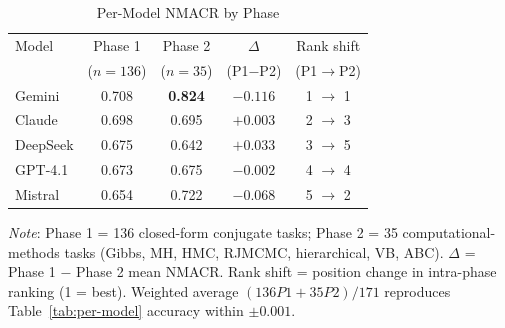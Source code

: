 \begin{table}[H]
  \centering
  \caption{Per-Model NMACR by Phase}
  \label{tab:per-phase}
  \begin{tabular}{lcccc}
    \toprule
    Model & Phase 1 & Phase 2 & $\Delta$ & Rank shift \\
          & ($n=136$) & ($n=35$) & (P1$-$P2) & (P1$\to$P2) \\
    \midrule
    Gemini    & 0.708 & \textbf{0.824} & $-0.116$ & 1 $\to$ 1 \\
    Claude    & 0.698 & 0.695 & $+0.003$ & 2 $\to$ 3 \\
    DeepSeek  & 0.675 & 0.642 & $+0.033$ & 3 $\to$ 5 \\
    GPT-4.1   & 0.673 & 0.675 & $-0.002$ & 4 $\to$ 4 \\
    Mistral   & 0.654 & 0.722 & $-0.068$ & 5 $\to$ 2 \\
    \bottomrule
  \end{tabular}

  \vspace{2pt}
  \footnotesize{\textit{Note}: Phase 1 = 136 closed-form conjugate
  tasks; Phase 2 = 35 computational-methods tasks (Gibbs, MH, HMC,
  RJMCMC, hierarchical, VB, ABC). $\Delta$ = Phase 1 $-$ Phase 2
  mean NMACR. Rank shift = position change in intra-phase ranking
  (1 = best). Weighted average $(136 P1 + 35 P2)/171$ reproduces
  Table~\ref{tab:per-model} accuracy within $\pm 0.001$.}
\end{table}
